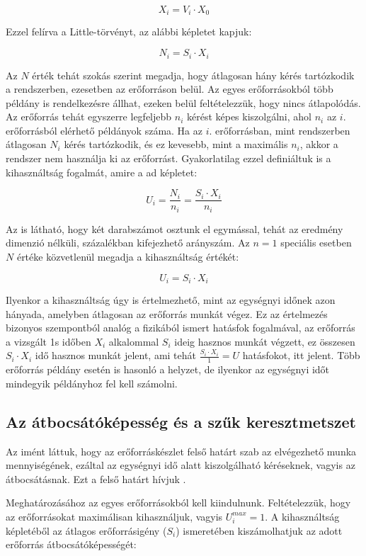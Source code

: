 $$X_i = V_i \cdot X_0$$

Ezzel felírva a Little-törvényt, az alábbi képletet kapjuk:

$$N_i = S_i \cdot X_i$$

Az $N$ érték tehát szokás szerint megadja, hogy átlagosan hány kérés tartózkodik a rendszerben, ezesetben az erőforráson belül. Az egyes erőforrásokból több példány is rendelkezésre állhat, ezeken belül feltételezzük, hogy nincs átlapolódás. Az erőforrás tehát egyszerre legfeljebb $n_i$ kérést képes kiszolgálni, ahol $n_i$ az $i.$ erőforrásból elérhető példányok száma. Ha az $i.$ erőforrásban, mint rendszerben átlagosan $N_i$ kérés tartózkodik, és ez kevesebb, mint a maximális $n_i$, akkor a rendszer nem használja ki az erőforrást. Gyakorlatilag ezzel definiáltuk is a kihasználtság fogalmát, amire a  ad képletet:

$$U_i = \frac{N_i}{n_i} = \frac{S_i \cdot X_i}{n_i}$$

Az is látható, hogy két darabszámot osztunk el egymással, tehát az eredmény dimenzió nélküli, százalékban kifejezhető arányszám. Az $n = 1$ speciális esetben $N$ értéke közvetlenül megadja a kihasználtság értékét:

$$U_i = S_i \cdot X_i$$

Ilyenkor a kihasználtság úgy is értelmezhető, mint az egységnyi időnek azon hányada, amelyben átlagosan az erőforrás munkát végez. Ez az értelmezés bizonyos szempontból analóg a fizikából ismert hatásfok fogalmával, az erőforrás a vizsgált 1s időben $X_i$ alkalommal $S_i$ ideig hasznos munkát végzett, ez összesen $S_i \cdot X_i$ idő hasznos munkát jelent, ami tehát $\frac{S_i \cdot X_i}{1} = U$ hatásfokot, itt  jelent. Több erőforrás példány esetén is hasonló a helyzet, de ilyenkor az egységnyi időt mindegyik példányhoz fel kell számolni.

\subsection{Az átbocsátóképesség és a szűk keresztmetszet}

Az imént láttuk, hogy az erőforráskészlet felső határt szab az elvégezhető munka mennyiségének, ezáltal az egységnyi idő alatt kiszolgálható kéréseknek, vagyis az átbocsátásnak. Ezt a felső határt hívjuk .

Meghatározásához az egyes erőforrásokból kell kiindulnunk. Feltételezzük, hogy az erőforrásokat maximálisan kihasználjuk, vagyis $U_i^{max} = 1$. A kihasználtság képletéből az átlagos erőforrásigény ($S_i$) ismeretében kiszámolhatjuk az adott erőforrás átbocsátóképességét:

